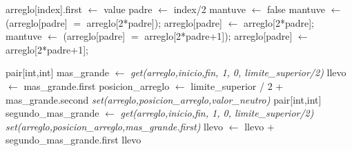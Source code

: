\begin{algorithmic}
	\State arreglo[index].first $\gets$ value
	\State padre $\gets$ index/2
	\State mantuve $\gets$ false
		 	\State mantuve $\gets$ (arreglo[padre] $=$ arreglo[2*padre]);
			\State arreglo[padre] $\gets$ arreglo[2*padre]; 	
		\Else
			\State mantuve $\gets$ (arreglo[padre] $=$ arreglo[2*padre+1]);
		 	\State arreglo[padre] $\gets$ arreglo[2*padre+1];
		\EndIf
	\EndWhile 
\EndFunction
\end{algorithmic}
\hspace{.5cm}

\begin{algorithmic}

	\State pair[int,int] mas_grande $\gets$ \textit{get(arreglo,inicio,fin, 1, 0, limite_superior/2)} 
	\State llevo $\gets$ mas_grande.first
	\State posicion_arreglo $\gets$ limite_superior / 2 + mas_grande.second
	\State \textit{set(arreglo,posicion_arreglo,valor_neutro)} 
	\State pair[int,int] segundo_mas_grande $\gets$ \textit{get(arreglo,inicio,fin, 1, 0, limite_superior/2)} 
	\State \textit{set(arreglo,posicion_arreglo,mas_grande.first)} 
	\State llevo $\gets$ llevo + segundo_mas_grande.first 
	\State \Return llevo

\EndFunction
\end{algorithmic}
\hspace{.5cm}

